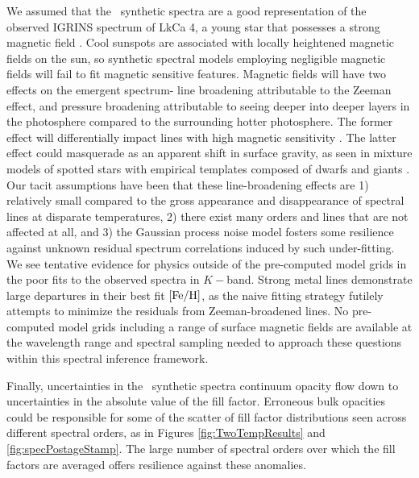 \documentclass[12pt]{report}
\begin{document}
We assumed that the \PHOENIX\ synthetic spectra are a good representation of the observed IGRINS spectrum of LkCa 4, a young star that possesses a strong magnetic field \citep{donati14}.  Cool sunspots are associated with locally heightened magnetic fields on the sun, so synthetic spectral models employing negligible magnetic fields will fail to fit magnetic sensitive features.  Magnetic fields will have two effects on the emergent spectrum- line broadening attributable to the Zeeman effect, and pressure broadening attributable to seeing deeper into deeper layers in the photosphere compared to the surrounding hotter photosphere.  The former effect will differentially impact lines with high magnetic sensitivity \citep[\emph{e.g.}][]{johnskrull99,deen13}.  The latter effect could masquerade as an apparent shift in surface gravity, as seen in mixture models of spotted stars with empirical templates composed of dwarfs and giants \citep{oneal96}.  Our tacit assumptions have been that these line-broadening effects are 1) relatively small compared to the gross appearance and disappearance of spectral lines at disparate temperatures, 2) there exist many orders and lines that are not affected at all, and 3) the Gaussian process noise model fosters some resilience against unknown residual spectrum correlations induced by such under-fitting.  We see tentative evidence for physics outside of the pre-computed model grids in the poor fits to the observed spectra in $K-$band.  Strong metal lines demonstrate large departures in their best fit $[{\rm Fe}/{\rm H}]$, as the na\:ive fitting strategy futilely attempts to minimize the residuals from Zeeman-broadened lines.  No pre-computed model grids including a range of surface magnetic fields are available at the wavelength range and spectral sampling needed to approach these questions within this spectral inference framework.

Finally, uncertainties in the \PHOENIX\ synthetic spectra continuum opacity flow down to uncertainties in the absolute value of the fill factor.  Erroneous bulk opacities could be responsible for some of the scatter of fill factor distributions seen across different spectral orders, as in Figures \ref{fig:TwoTempResults} and \ref{fig:specPostageStamp}.  The large number of spectral orders over which the fill factors are averaged offers resilience against these anomalies.
\end{document}
